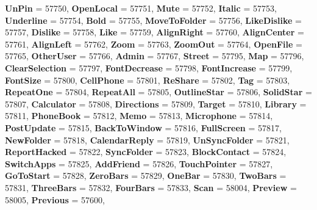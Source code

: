 \begin{DoxyCompactItemize}
{\bfseries Un\+Pin} = 57750, 
{\bfseries Open\+Local} = 57751, 
{\bfseries Mute} = 57752, 
{\bfseries Italic} = 57753, 
\newline
{\bfseries Underline} = 57754, 
{\bfseries Bold} = 57755, 
{\bfseries Move\+To\+Folder} = 57756, 
{\bfseries Like\+Dislike} = 57757, 
\newline
{\bfseries Dislike} = 57758, 
{\bfseries Like} = 57759, 
{\bfseries Align\+Right} = 57760, 
{\bfseries Align\+Center} = 57761, 
\newline
{\bfseries Align\+Left} = 57762, 
{\bfseries Zoom} = 57763, 
{\bfseries Zoom\+Out} = 57764, 
{\bfseries Open\+File} = 57765, 
\newline
{\bfseries Other\+User} = 57766, 
{\bfseries Admin} = 57767, 
{\bfseries Street} = 57795, 
{\bfseries Map} = 57796, 
\newline
{\bfseries Clear\+Selection} = 57797, 
{\bfseries Font\+Decrease} = 57798, 
{\bfseries Font\+Increase} = 57799, 
{\bfseries Font\+Size} = 57800, 
\newline
{\bfseries Cell\+Phone} = 57801, 
{\bfseries Re\+Share} = 57802, 
{\bfseries Tag} = 57803, 
{\bfseries Repeat\+One} = 57804, 
\newline
{\bfseries Repeat\+All} = 57805, 
{\bfseries Outline\+Star} = 57806, 
{\bfseries Solid\+Star} = 57807, 
{\bfseries Calculator} = 57808, 
\newline
{\bfseries Directions} = 57809, 
{\bfseries Target} = 57810, 
{\bfseries Library} = 57811, 
{\bfseries Phone\+Book} = 57812, 
\newline
{\bfseries Memo} = 57813, 
{\bfseries Microphone} = 57814, 
{\bfseries Post\+Update} = 57815, 
{\bfseries Back\+To\+Window} = 57816, 
\newline
{\bfseries Full\+Screen} = 57817, 
{\bfseries New\+Folder} = 57818, 
{\bfseries Calendar\+Reply} = 57819, 
{\bfseries Un\+Sync\+Folder} = 57821, 
\newline
{\bfseries Report\+Hacked} = 57822, 
{\bfseries Sync\+Folder} = 57823, 
{\bfseries Block\+Contact} = 57824, 
{\bfseries Switch\+Apps} = 57825, 
\newline
{\bfseries Add\+Friend} = 57826, 
{\bfseries Touch\+Pointer} = 57827, 
{\bfseries Go\+To\+Start} = 57828, 
{\bfseries Zero\+Bars} = 57829, 
\newline
{\bfseries One\+Bar} = 57830, 
{\bfseries Two\+Bars} = 57831, 
{\bfseries Three\+Bars} = 57832, 
{\bfseries Four\+Bars} = 57833, 
\newline
{\bfseries Scan} = 58004, 
{\bfseries Preview} = 58005, 
{\bfseries Previous} = 57600, 

\end{DoxyCompactItemize}
